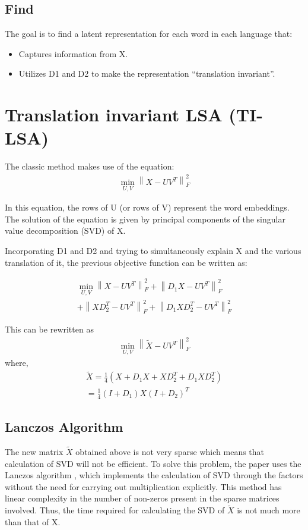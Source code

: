 \documentclass[11pt]{article}
\begin{document}
\subsection{Find}
The goal is to find a latent representation for each word in each language that:
\begin{itemize}
  \item Captures information from X.
  \item Utilizes D1 and D2 to make the representation “translation invariant”.
\end{itemize}


\section{Translation invariant LSA (TI-LSA)} \label{tilsa}
The classic method makes use of the equation: \begin{multline}\min_{U,V}\left\lVert X - UV^T \right\rVert^{2}_F\end{multline}

In this equation, the rows of U (or rows of V) represent the word embeddings. The solution of the equation is given by principal components of the singular value decomposition (SVD) of X.

Incorporating D1 and D2 and trying to simultaneously explain X and the various translation of it, the previous objective function can be written as:

\begin{multline}
\min_{U,V}\left\lVert X - UV^T \right\rVert^{2}_F + \left\lVert D_{1}X - UV^T \right\rVert^{2}_F \\+ \left\lVert XD^{T}_2 - UV^T \right\rVert^{2}_F + \left\lVert D_{1}XD^{T}_2 - UV^T \right\rVert^{2}_F
\end{multline}

This can be rewritten as \begin{multline}\min_{U,V}\left\lVert \widetilde{X} - UV^T \right\rVert^{2}_F\end{multline} where,
\begin{multline}
\widetilde{X} = \frac{1}{4}(X + D_{1}X + XD^{T}_2 +D_{1}XD^{T}_2 ) \\
= \frac{1}{4}(I + D_{1})X(I + D_2)^{T}
\end{multline}

\subsection{Lanczos Algorithm}
The new matrix $\widetilde{X}$ obtained above is not very sparse which means that calculation of SVD will not be efficient. To solve this problem, the paper uses the Lanczos algorithm \cite{van1996matrix}, which implements the calculation of SVD through the factors without the need for carrying out multiplication explicitly. This method has linear complexity in the number of non-zeros present in the sparse matrices involved.
Thus, the time required for calculating the SVD of $\widetilde{X}$ is not much more than that of X.
\end{document}
